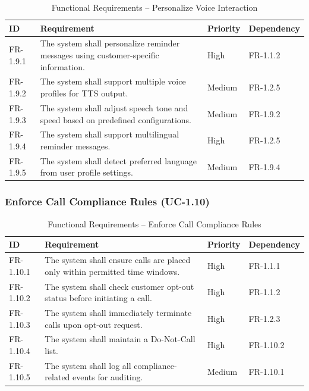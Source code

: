 \documentclass[12pt,a4paper]{report}
\begin{document}
\begin{table}[H]
\centering
\caption{Functional Requirements – Personalize Voice Interaction}
\begin{tabularx}{\textwidth}{|l|X|l|l|}
\hline
\textbf{ID} & \textbf{Requirement} & \textbf{Priority} & \textbf{Dependency} \\ \hline

FR-1.9.1 & The system shall personalize reminder messages using customer-specific information. & High & FR-1.1.2 \\ \hline

FR-1.9.2 & The system shall support multiple voice profiles for TTS output. & Medium & FR-1.2.5 \\ \hline

FR-1.9.3 & The system shall adjust speech tone and speed based on predefined configurations. & Medium & FR-1.9.2 \\ \hline

FR-1.9.4 & The system shall support multilingual reminder messages. & High & FR-1.2.5 \\ \hline

FR-1.9.5 & The system shall detect preferred language from user profile settings. & Medium & FR-1.9.4 \\ \hline

\end{tabularx}
\end{table}
\subsubsection{Enforce Call Compliance Rules (UC-1.10)}

\begin{table}[H]
\centering
\caption{Functional Requirements – Enforce Call Compliance Rules}
\begin{tabularx}{\textwidth}{|l|X|l|l|}
\hline
\textbf{ID} & \textbf{Requirement} & \textbf{Priority} & \textbf{Dependency} \\ \hline

FR-1.10.1 & The system shall ensure calls are placed only within permitted time windows. & High & FR-1.1.1 \\ \hline

FR-1.10.2 & The system shall check customer opt-out status before initiating a call. & High & FR-1.1.2 \\ \hline

FR-1.10.3 & The system shall immediately terminate calls upon opt-out request. & High & FR-1.2.3 \\ \hline

FR-1.10.4 & The system shall maintain a Do-Not-Call list. & High & FR-1.10.2 \\ \hline

FR-1.10.5 & The system shall log all compliance-related events for auditing. & Medium & FR-1.10.1 \\ \hline

\end{tabularx}
\end{table}
\end{document}

